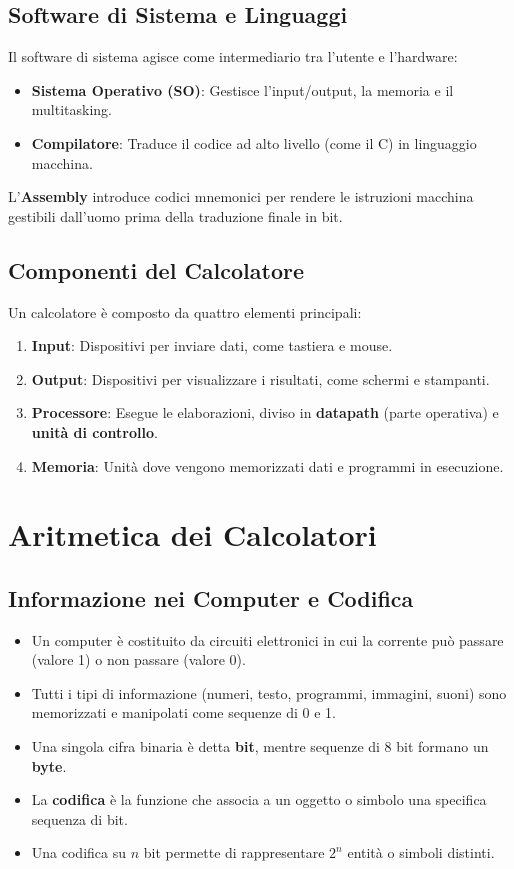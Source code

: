 \documentclass[12pt, a4paper]{article}
\begin{document}
\subsection{Software di Sistema e Linguaggi}
Il software di sistema agisce come intermediario tra l'utente e l'hardware:
\begin{itemize}
    \item \textbf{Sistema Operativo (SO)}: Gestisce l'input/output, la memoria e il multitasking.
    \item \textbf{Compilatore}: Traduce il codice ad alto livello (come il C) in linguaggio macchina.
\end{itemize}
L'\textbf{Assembly} introduce codici mnemonici per rendere le istruzioni macchina gestibili dall'uomo prima della traduzione finale in bit.

\subsection{Componenti del Calcolatore}
Un calcolatore è composto da quattro elementi principali:
\begin{enumerate}
    \item \textbf{Input}: Dispositivi per inviare dati, come tastiera e mouse.
    \item \textbf{Output}: Dispositivi per visualizzare i risultati, come schermi e stampanti.
    \item \textbf{Processore}: Esegue le elaborazioni, diviso in \textbf{datapath} (parte operativa) e \textbf{unità di controllo}.
    \item \textbf{Memoria}: Unità dove vengono memorizzati dati e programmi in esecuzione.
\end{enumerate}
\section{Aritmetica dei Calcolatori}


\subsection{Informazione nei Computer e Codifica}

\begin{itemize}
    \item Un computer è costituito da circuiti elettronici in cui la corrente può passare (valore 1) o non passare (valore 0). 
    \item Tutti i tipi di informazione (numeri, testo, programmi, immagini, suoni) sono memorizzati e manipolati come sequenze di 0 e 1. 
    \item Una singola cifra binaria è detta \textbf{bit}, mentre sequenze di 8 bit formano un \textbf{byte}. 
    \item La \textbf{codifica} è la funzione che associa a un oggetto o simbolo una specifica sequenza di bit. 
    \item Una codifica su $n$ bit permette di rappresentare $2^n$ entità o simboli distinti. 
\end{itemize}
\end{document}
